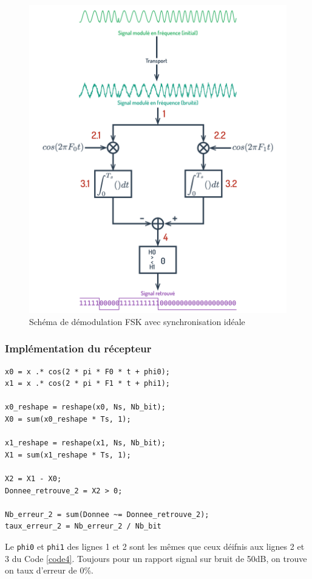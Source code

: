 \begin{figure}[H]
   \centering
   \includegraphics[scale=0.4]{partie-3/sous-partie-1/filtre1.png}
   \caption{Schéma de démodulation FSK avec synchronisation idéale} \label{fig:filtre1}
\end{figure}
\subsubsection{Implémentation du récepteur}
\begin{lstlisting}[caption=Récepteur V21 à synchronisation idéale, label=code:syn-ideal]
x0 = x .* cos(2 * pi * F0 * t + phi0);
x1 = x .* cos(2 * pi * F1 * t + phi1);

x0_reshape = reshape(x0, Ns, Nb_bit);
X0 = sum(x0_reshape * Ts, 1);

x1_reshape = reshape(x1, Ns, Nb_bit);
X1 = sum(x1_reshape * Ts, 1);

X2 = X1 - X0;
Donnee_retrouve_2 = X2 > 0;

Nb_erreur_2 = sum(Donnee ~= Donnee_retrouve_2);
taux_erreur_2 = Nb_erreur_2 / Nb_bit
\end{lstlisting}

Le \lstinline{phi0} et \lstinline{phi1} des lignes 1 et 2 sont les mêmes que ceux déifnis aux lignes 2 et 3 du Code \ref{code4}.
Toujours pour un rapport signal sur bruit de 50dB, on trouve on taux d'erreur de 0\%.